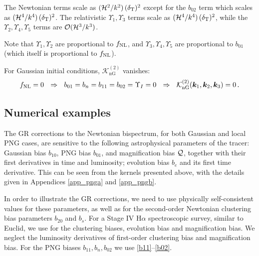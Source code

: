 {{{\begin{itemize}
{The Newtonian terms scale as $(\mathcal{H}^2/k^2)\,(\delta_{\mathrm{T}})^2$ except for the $b_{02}$ term which scales as $(\mathcal{H}^4/k^4)\,(\delta_{\mathrm{T}})^2$. The relativistic $\Upsilon_1, \Upsilon_3$ terms scale as $(\mathcal{H}^4/k^4)\,(\delta_{\mathrm{T}})^2$, while the $\Upsilon_2, \Upsilon_4, \Upsilon_5$ terms are  ${\cal O}(\mathcal{H}^3/k^3)$.}

Note that $\Upsilon_1,\Upsilon_2$ are proportional to $f_\text{NL}$, and $\Upsilon_3,\Upsilon_4,\Upsilon_5$ are  proportional to $b_{01}$ (which itself is proportional to $f_\text{NL}$).

For Gaussian initial conditions, $\mathcal{K}^{(2)}_{\mathrm{nG}}$ vanishes: 
\begin{equation}
f_\text{NL}=0~~\Rightarrow~~b_{01}=b_n=b_{11}=b_{02}=\Upsilon_I=0 ~~\Rightarrow~~ \mathcal{K}^{(2)}_{\mathrm{nG}}(\bm{k}_{1}, \bm{k}_{2}, \bm{k}_{3})=0\,.
\end{equation}

\end{itemize}
%
\subsection{Numerical examples}
{The GR corrections to the Newtonian bispectrum, for both Gaussian and local PNG cases, are sensitive to the following astrophysical parameters of the tracer: Gaussian bias $b_{10}$, PNG bias $b_{01}$,  and magnification bias ${\cal Q}$, together with  their first derivatives in time and luminosity; evolution bias $b_e$ and its first  time derivative. This can be seen from the kernels presented above,  with the details given in Appendices \ref{app_pnga} and \ref{app_pngb}.} 

In order to illustrate the GR corrections, we need to use physically self-consistent values for these parameters, as well as for the second-order Newtonian clustering bias parameters $b_{20}$ and $b_s$.  
For a Stage IV H$\alpha$ spectroscopic survey, similar to Euclid,  we use \cite{Maartens:2019yhx} for the  clustering biases, evolution bias and magnification bias. {We neglect the luminosity derivatives of first-order clustering bias and magnification bias. For the PNG biases $b_{11}, b_n, b_{02}$ we use \eqref{b11}--\eqref{b02}.}

}}}
